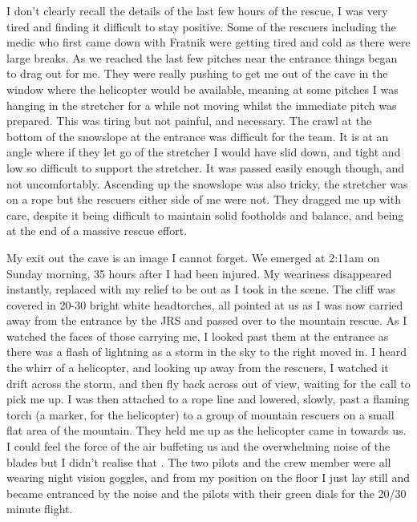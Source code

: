     I don't clearly recall the details of the last few hours of the rescue, I was very tired and finding it difficult to stay positive. Some of the rescuers including the medic who first came down with Fratnik were getting tired and cold as there were large breaks. As we reached the last few pitches near the entrance things began to drag out for me. They were really pushing to get me out of the cave in the window where the helicopter would be available, meaning at some pitches I was hanging in the stretcher for a while not moving whilst the immediate pitch was prepared. This was tiring but not painful, and necessary. The crawl at the bottom of the snowslope at the entrance was difficult for the team. It is at an angle where if they let go of the stretcher I would have slid down, and tight and low so difficult to support the stretcher. It was passed easily enough though, and not uncomfortably. Ascending up the snowslope was also tricky, the stretcher was on a rope but the rescuers either side of me were not. They dragged me up with care, despite it being difficult to maintain solid footholds and balance, and being at the end of a massive rescue effort.

    My exit out the cave is an image I cannot forget. We emerged at 2:11am on Sunday morning, 35 hours after I had been injured. My weariness disappeared instantly, replaced with my relief to be out as I took in the scene. The cliff was covered in 20-30 bright white headtorches, all pointed at us as I was now carried away from the entrance by the JRS and passed over to the mountain rescue. As I watched the faces of those carrying me, I looked past them at the  entrance as there was a flash of lightning as a storm in the sky to the right moved in. I heard the whirr of a helicopter, and looking up away from the rescuers, I watched it drift across the storm, and then fly back across out of view, waiting for the call to pick me up. I was then attached to a rope line and lowered, slowly, past a flaming torch (a marker, for the helicopter) to a group of mountain rescuers on a small flat area of the mountain. They held me up as the helicopter came in towards us. I could feel the force of the air buffeting us and the overwhelming noise of the blades but I didn't realise that . The two pilots and the crew member were all wearing night vision goggles, and from my position on the floor I just lay still and became entranced by the noise and the pilots with their green dials for the 20/30 minute flight.

